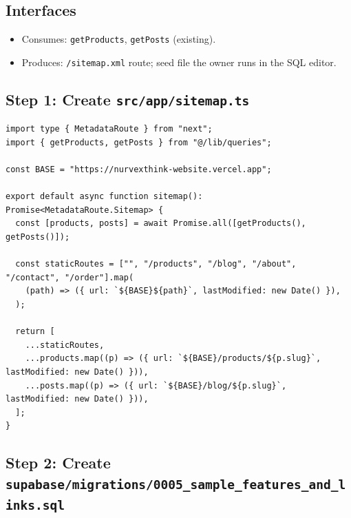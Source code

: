 \documentclass[11pt,a4paper]{article}
\begin{document}
\subsection*{Interfaces}
\begin{itemize}
  \item Consumes: \texttt{getProducts}, \texttt{getPosts} (existing).
  \item Produces: \texttt{/sitemap.xml} route; seed file the owner runs in the SQL editor.
\end{itemize}

\subsection*{Step 1: Create \texttt{src/app/sitemap.ts}}

\begin{lstlisting}
import type { MetadataRoute } from "next";
import { getProducts, getPosts } from "@/lib/queries";

const BASE = "https://nurvexthink-website.vercel.app";

export default async function sitemap(): Promise<MetadataRoute.Sitemap> {
  const [products, posts] = await Promise.all([getProducts(), getPosts()]);

  const staticRoutes = ["", "/products", "/blog", "/about", "/contact", "/order"].map(
    (path) => ({ url: `${BASE}${path}`, lastModified: new Date() }),
  );

  return [
    ...staticRoutes,
    ...products.map((p) => ({ url: `${BASE}/products/${p.slug}`, lastModified: new Date() })),
    ...posts.map((p) => ({ url: `${BASE}/blog/${p.slug}`, lastModified: new Date() })),
  ];
}
\end{lstlisting}

\subsection*{Step 2: Create \texttt{supabase/migrations/0005\_sample\_features\_and\_links.sql}}
\end{document}
